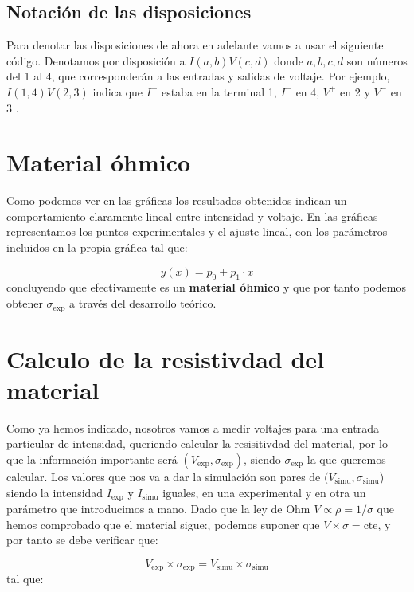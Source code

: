 \documentclass[11pt]{article}
\newcommand{\cte}{\text{cte}}
\newcommand{\simu}{\text{simu}}
\begin{document}
\subsection{Notación de las disposiciones}

Para denotar las disposiciones de ahora en adelante vamos a usar el siguiente código. Denotamos por disposición a $I(a,b)V(c,d)$ donde $a,b,c,d$ son números del 1 al 4, que corresponderán a las entradas y salidas de voltaje. Por ejemplo, $I(1,4)V(2,3)$ indica que $I^+$ estaba en la terminal 1, $I^-$ en 4, $V^+$ en 2 y $V^-$ en 3 \cite{IvanCambon}.

\section{Material óhmico}

Como podemos ver en las gráficas los resultados obtenidos indican un comportamiento claramente lineal entre intensidad y voltaje. En las gráficas representamos los puntos experimentales y el ajuste lineal, con los parámetros incluidos en la propia gráfica tal que: 

\begin{equation}
	y(x) = p_0 + p_1 \cdot x
\end{equation}
concluyendo que efectivamente es un \textbf{material óhmico} y que por tanto podemos obtener $\sigma_{\exp}$ a través del desarrollo teórico. 

\section{Calculo de la resistivdad del material}

Como ya hemos indicado, nosotros vamos a medir voltajes para una entrada particular de intensidad, queriendo calcular la resisitivdad del material, por lo que la información importante será $(V_{\exp},\sigma_{\exp})$, siendo $\sigma_{\exp}$ la que queremos calcular. Los valores que nos va a dar la simulación son pares de $(V_{\simu},\sigma_{\simu}$) siendo la intensidad $I_{\exp}$ y $I_{\simu}$ iguales, en una experimental y en otra un parámetro que introducimos a mano. Dado que la ley de Ohm $V\varpropto \rho = 1 / \sigma$ que hemos comprobado que el material sigue:, podemos suponer que $V\times \sigma = \cte$, y por tanto se debe verificar que: 

\begin{equation}
	V_{\exp} \times \sigma_{\exp} = V_{\simu} \times \sigma_{\simu}
\end{equation}
tal que: 
\end{document}
